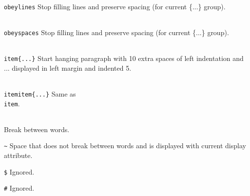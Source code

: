 \item{\tt \\obeylines}	Stop filling lines and preserve spacing
			(for current \{...\} group).
\item{\tt \\obeyspaces} Stop filling lines and preserve spacing
			(for current \{...\} group).
\item{\tt \\item\{...\}}
			Start hanging paragraph with 10 extra
			spaces of left indentation and ... displayed in
			left margin and indented 5.
\item{\tt \\itemitem\{...\}}
			Same as {\tt \\item}.
\item{\tt \\<space-character>}
			Break between words.
\item{\tt \~}		Space that does not break between words and
			is displayed with current display attribute.
\item{\tt \$}		Ignored.
\item{\tt \#}		Ignored.

\bigskip
{}
\bye

